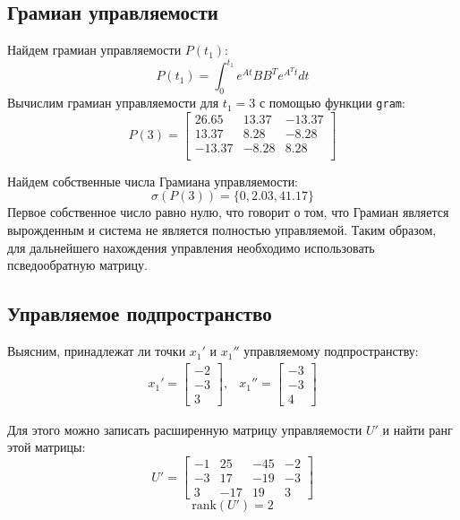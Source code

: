 \subsection{Грамиан управляемости}
Найдем грамиан управляемости $P(t_1)$:
\begin{equation}
    P(t_1) = \int_{0}^{t_1} e^{At}BB^Te^{A^Tt}dt
\end{equation}
Вычислим грамиан управляемости для $t_1 = 3$ с помощью функции \texttt{gram}: 
\begin{equation}
    P(3) = \begin{bmatrix}
        26.65 & 13.37 & -13.37 \\ 
        13.37 & 8.28 & -8.28 \\ 
        -13.37 & -8.28 & 8.28 \\ 
    \end{bmatrix}
\end{equation}

Найдем собственные числа Грамиана управляемости:
\begin{equation}
   \sigma(P(3)) = \{0, 2.03, 41.17 \}
\end{equation}
Первое собственное число равно нулю, что говорит о том, что Грамиан является вырожденным и система не является полностью
управляемой. Таким образом, для дальнейшего нахождения управления необходимо использовать псведообратную матрицу. 

\subsection{Управляемое подпространство}
Выясним, принадлежат ли точки $x_1'$ и $x_1''$ управляемому подпространству:
\begin{equation}
    \begin{array}{cc}
        x_1' = \begin{bmatrix}
            -2 \\
            -3 \\
            3
        \end{bmatrix}, &
        x_1'' = \begin{bmatrix}
            -3 \\
            -3 \\
            4
        \end{bmatrix}
    \end{array}
\end{equation}

Для этого можно записать расширенную матрицу управляемости $U'$ и найти ранг этой матрицы:
\begin{equation}
    U' = \begin{bmatrix}
        -1 & 25 & -45 & -2 \\
        -3 & 17 & -19 & -3 \\
        3 & -17 & 19 & 3
    \end{bmatrix}
\end{equation}
\begin{equation}
    \text{rank}(U') = 2
\end{equation}

